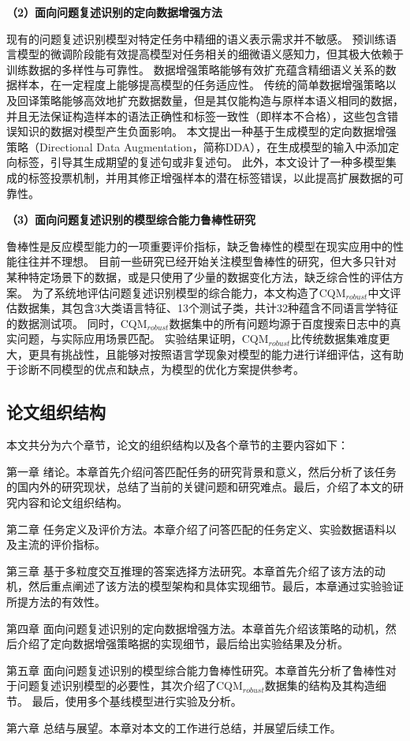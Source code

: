 \textbf{\songti （2）面向问题复述识别的定向数据增强方法}

现有的问题复述识别模型对特定任务中精细的语义表示需求并不敏感。
预训练语言模型的微调阶段能有效提高模型对任务相关的细微语义感知力，但其极大依赖于训练数据的多样性与可靠性。
数据增强策略能够有效扩充蕴含精细语义关系的数据样本，在一定程度上能够提高模型的任务适应性。
传统的简单数据增强策略以及回译策略能够高效地扩充数据数量，但是其仅能构造与原样本语义相同的数据，并且无法保证构造样本的语法正确性和标签一致性（即样本不合格），这些包含错误知识的数据对模型产生负面影响。
本文提出一种基于生成模型的定向数据增强策略（Directional Data Augmentation，简称DDA），在生成模型的输入中添加定向标签，引导其生成期望的复述句或非复述句。
此外，本文设计了一种多模型集成的标签投票机制，并用其修正增强样本的潜在标签错误，以此提高扩展数据的可靠性。

\textbf{\songti （3）面向问题复述识别的模型综合能力鲁棒性研究}

鲁棒性是反应模型能力的一项重要评价指标，缺乏鲁棒性的模型在现实应用中的性能往往并不理想。
目前一些研究已经开始关注模型鲁棒性的研究，但大多只针对某种特定场景下的数据，或是只使用了少量的数据变化方法，缺乏综合性的评估方案。
为了系统地评估问题复述识别模型的综合能力，本文构造了CQM$_{robust}$中文评估数据集，其包含3大类语言特征、13个测试子类，共计32种蕴含不同语言学特征的数据测试项。
同时，CQM$_{robust}$数据集中的所有问题均源于百度搜索日志中的真实问题，与实际应用场景匹配。
实验结果证明，CQM$_{robust}$比传统数据集难度更大，更具有挑战性，且能够对按照语言学现象对模型的能力进行详细评估，这有助于诊断不同模型的优点和缺点，为模型的优化方案提供参考。


\subsection{论文组织结构}

本文共分为六个章节，论文的组织结构以及各个章节的主要内容如下：

第一章 \quad 绪论。本章首先介绍问答匹配任务的研究背景和意义，然后分析了该任务的国内外的研究现状，总结了当前的关键问题和研究难点。最后，介绍了本文的研究内容和论文组织结构。

第二章 \quad 任务定义及评价方法。本章介绍了问答匹配的任务定义、实验数据语料以及主流的评价指标。

第三章 \quad 基于多粒度交互推理的答案选择方法研究。本章首先介绍了该方法的动机，然后重点阐述了该方法的模型架构和具体实现细节。最后，本章通过实验验证所提方法的有效性。

第四章 \quad 面向问题复述识别的定向数据增强方法。本章首先介绍该策略的动机，然后介绍了定向数据增强策略据的实现细节，最后给出实验结果及分析。

第五章 \quad 面向问题复述识别的模型综合能力鲁棒性研究。本章首先分析了鲁棒性对于问题复述识别模型的必要性，其次介绍了CQM$_{robust}$数据集的结构及其构造细节。
最后，使用多个基线模型进行实验及分析。

第六章 \quad 总结与展望。本章对本文的工作进行总结，并展望后续工作。



